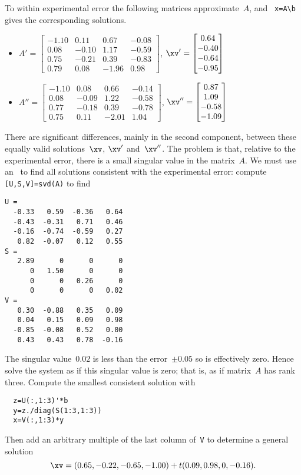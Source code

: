 \begin{example}
\begin{enumerate}
\begin{solution}
To within experimental error the following matrices approximate~\(A\), and \script\ \verb|x=A\b| gives the corresponding solutions.
\begin{itemize}\small
\item \(A'=\begin{bmatrix} -1.10&0.11&0.67&-0.08
\\0.08&-0.10&1.17&-0.59
\\0.75&-0.21&0.39&-0.83
\\0.79&0.08&-1.96&0.98 \end{bmatrix}\),
\(\xv'=\begin{bmatrix} 0.64
\\-0.40
\\-0.64
\\-0.95 \end{bmatrix}\)
\item \(A''=\begin{bmatrix} -1.10&0.08&0.66&-0.14
\\0.08&-0.09&1.22&-0.58
\\0.77&-0.18&0.39&-0.78
\\0.75&0.11&-2.01&1.04 \end{bmatrix}\),
\(\xv''=\begin{bmatrix} 0.87
\\1.09
\\-0.58
\\-1.09 \end{bmatrix}\)
\end{itemize}
There are significant differences, mainly in the second component, between these equally valid solutions~\(\xv\), \(\xv'\) and~\(\xv''\).
The problem is that, relative to the experimental error, there is a small singular value in the matrix~\(A\).
We must use an \svd\ to find all solutions consistent with the experimental error: compute \verb|[U,S,V]=svd(A)| to find \twodp
\begin{verbatim}
U =
  -0.33   0.59  -0.36   0.64
  -0.43  -0.31   0.71   0.46
  -0.16  -0.74  -0.59   0.27
   0.82  -0.07   0.12   0.55
S =
   2.89      0      0      0
      0   1.50      0      0
      0      0   0.26      0
      0      0      0   0.02
V =
   0.30  -0.88   0.35   0.09
   0.04   0.15   0.09   0.98
  -0.85  -0.08   0.52   0.00
   0.43   0.43   0.78  -0.16
\end{verbatim}
The singular value~\(0.02\) is less than the error~\(\pm0.05\) so is effectively zero.
Hence solve the system as if this singular value is zero; that is, as if matrix~\(A\) has rank three.
Compute the smallest consistent solution with 
\begin{verbatim}
  z=U(:,1:3)'*b
  y=z./diag(S(1:3,1:3))
  x=V(:,1:3)*y
\end{verbatim}
Then add an arbitrary multiple of the last column of~\verb|V| to determine a general solution \twodp
\begin{equation*}
\xv=(0.65,-0.22,-0.65,-1.00)+t(0.09,0.98,0,-0.16).
\end{equation*}



\end{solution}
\end{enumerate}
\end{example}
